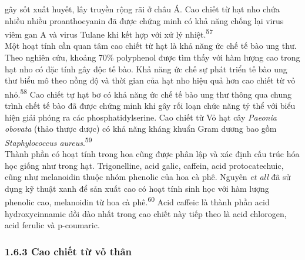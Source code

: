 \documentclass[
  letterpaper,
  DIV=11,
  numbers=noendperiod]{scrartcl}
\begin{document}
gây sốt xuất huyết, lây truyền rộng rãi ở châu Á. Cao chiết từ hạt nho
chứa nhiều nhiều proanthocyanin đã được chứng minh có khả năng chống lại
virus viêm gan A và virus Tulane khi kết hợp với xử lý
nhiệt.\textsuperscript{57}\\
Một hoạt tính cần quan tâm cao chiết từ hạt là khả năng ức chế tế bào
ung thư. Theo nghiên cứu, khoảng 70\% polyphenol được tìm thấy với hàm
lượng cao trong hạt nho có đặc tính gây độc tế bào. Khả năng ức chế sự
phát triển tế bào ung thư biểu mô theo nồng độ và thời gian của hạt nho
hiệu quả hơn cao chiết từ vỏ nhỏ.\textsuperscript{58} Cao chiết tự hạt
bơ có khả năng ức chế tế bào ung thư thông qua chung trình chết tế bào
đã được chứng minh khi gây rối loạn chức năng tỷ thể với biểu hiện giải
phóng ra các phosphatidylserine. Cao chiết từ Vỏ hạt cây \emph{Paeonia
obovata} (thảo thược dược) có khả năng kháng khuẩn Gram dương bao gồm
\emph{Staphylococcus aureus}.\textsuperscript{59}\\
Thành phần có hoạt tính trong hoa cũng được phân lập và xác định cấu
trúc hóa học giống như trong hạt. Trigonelline, acid galic, caffein,
acid protocatechuic, cũng như melanoidin thuộc nhóm phenolic của hoa cà
phê. Nguyên \emph{et all} đã sử dụng kỹ thuật xanh để sản xuất cao có
hoạt tính sinh học với hàm lượng phenolic cao, melanoidin từ hoa cà
phê.\textsuperscript{60} Acid caffeic là thành phần acid hydroxycinnamic
dồi dào nhất trong cao chiết này tiếp theo là acid chlorogen, acid
ferulic và p-coumaric.

\subsubsection{1.6.3 Cao chiết từ vỏ
thân}\label{cao-chiux1ebft-tux1eeb-vux1ecf-thuxe2n}
\end{document}

